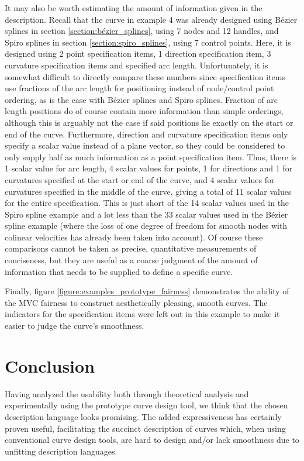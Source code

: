 \documentclass[a4paper]{article}
\begin{document}
			It may also be worth estimating the amount of information given in the description. Recall that the curve in example 4 was already designed using Bézier splines in section \ref{section:bézier_splines}, using 7 nodes and 12 handles, and Spiro splines in section \ref{section:spiro_splines}, using 7 control points. Here, it is designed using 2 point specification items, 1 direction specification item, 3 curvature specification items and specified arc length. Unfortunately, it is somewhat difficult to directly compare these numbers since specification items use fractions of the arc length for positioning instead of node/control point ordering, as is the case with Bézier splines and Spiro splines. Fraction of arc length positions do of course contain more information than simple orderings, although this is arguably not the case if said positions lie exactly on the start or end of the curve. Furthermore, direction and curvature specification items only specify a scalar value instead of a plane vector, so they could be considered to only supply half as much information as a point specification item. Thus, there is 1 scalar value for arc length, 4 scalar values for points, 1 for directions and 1 for curvatures specified at the start or end of the curve, and 4 scalar values for curvatures specified in the middle of the curve, giving a total of 11 scalar values for the entire specification. This is just short of the 14 scalar values used in the Spiro spline example and a lot less than the 33 scalar values used in the Bézier spline example (where the loss of one degree of freedom for smooth nodes with colinear velocities has already been taken into account). Of course these comparisons cannot be taken as precise, quantitative measurements of conciseness, but they are useful as a coarse judgment of the amount of information that needs to be supplied to define a specific curve.

			Finally, figure \ref{figure:examples_prototype_fairness} demonstrates the ability of the MVC fairness to construct aesthetically pleasing, smooth curves. The indicators for the specification items were left out in this example to make it easier to judge the curve's smoothness.

	\section{Conclusion}
	\label{section:conclusion}

		Having analyzed the usability both through theoretical analysis and experimentally using the prototype curve design tool, we think that the chosen description language looks promising. The added expressiveness has certainly proven useful, facilitating the succinct description of curves which, when using conventional curve design tools, are hard to design and/or lack smoothness due to unfitting description languages.
\end{document}
